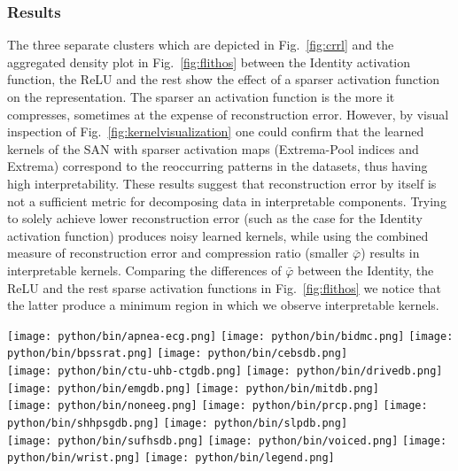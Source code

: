 \documentclass[journal]{IEEEtran}
\begin{document}
\subsubsection{Results}
The three separate clusters which are depicted in Fig.~\ref{fig:crrl} and the aggregated density plot in Fig.~\ref{fig:flithos} between the Identity activation function, the ReLU and the rest show the effect of a sparser activation function on the representation.
The sparser an activation function is the more it compresses, sometimes at the expense of reconstruction error.
However, by visual inspection of Fig.~\ref{fig:kernelvisualization} one could confirm that the learned kernels of the SAN with sparser activation maps (Extrema-Pool indices and Extrema) correspond to the reoccurring patterns in the datasets, thus having high interpretability.
These results suggest that reconstruction error by itself is not a sufficient metric for decomposing data in interpretable components.
Trying to solely achieve lower reconstruction error (such as the case for the Identity activation function) produces noisy learned kernels, while using the combined measure of reconstruction error and compression ratio (smaller $\bar\varphi$) results in interpretable kernels.
Comparing the differences of $\bar\varphi$ between the Identity, the ReLU and the rest sparse activation functions in Fig.~\ref{fig:flithos} we notice that the latter produce a minimum region in which we observe interpretable kernels.

\begin{figure*}[!t]
	\texttt{[image: python/bin/apnea-ecg.png]}
	\texttt{[image: python/bin/bidmc.png]}
	\texttt{[image: python/bin/bpssrat.png]}
	\texttt{[image: python/bin/cebsdb.png]}
	\\
	\texttt{[image: python/bin/ctu-uhb-ctgdb.png]}
	\texttt{[image: python/bin/drivedb.png]}
	\texttt{[image: python/bin/emgdb.png]}
	\texttt{[image: python/bin/mitdb.png]}
	\\
	\texttt{[image: python/bin/noneeg.png]}
	\texttt{[image: python/bin/prcp.png]}
	\texttt{[image: python/bin/shhpsgdb.png]}
	\texttt{[image: python/bin/slpdb.png]}
	\\
	\texttt{[image: python/bin/sufhsdb.png]}
	\texttt{[image: python/bin/voiced.png]}
	\texttt{[image: python/bin/wrist.png]}
	\texttt{[image: python/bin/legend.png]}
	\caption{Inverse compression ratio ($CR^{-1}$) vs.\ normalized reconstruction loss ($\tilde{\mathcal{L}}$) for the $15$ datasets of Physionet for various kernel sizes.
	The five inner plots with the yellow background on the right of each subplot, depict the corresponding kernel for the kernel size that achieved the best $\bar\varphi$.}\label{fig:crrl}
\end{figure*}
\end{document}
